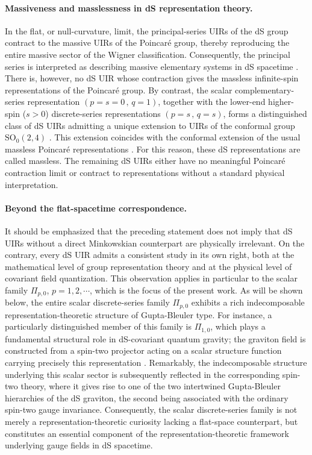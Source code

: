 \documentclass[aps,twocolumn,nofootinbib]{revtex4}
\begin{document}
\paragraph{Massiveness and masslessness in dS representation theory.} In the flat, or null-curvature, limit, the principal-series UIRs of the dS group contract to the massive UIRs of the Poincar\'{e} group, thereby reproducing the entire massive sector of the Wigner classification. Consequently, the principal series is interpreted as describing massive elementary systems in dS spacetime \cite{Gazeau2022, Mickelsson, Garidi}. There is, however, no dS UIR whose contraction gives the massless infinite-spin representations of the Poincar\'{e} group. By contrast, the scalar complementary-series representation $(p=s=0 \,,\, q=1)$, together with the lower-end higher-spin ($s>0$) discrete-series representations $(p=s \,,\, q=s)$, forms a distinguished class of dS UIRs admitting a unique extension to UIRs of the conformal group $\mathrm{SO}_0(2,4)$ \cite{GazPejTod2026, Barut}. This extension coincides with the conformal extension of the usual massless Poincar\'{e} representations \cite{Todorov, Mack}. For this reason, these dS representations are called massless. The remaining dS UIRs either have no meaningful Poincar\'{e} contraction limit or contract to representations without a standard physical interpretation.

\paragraph{Beyond the flat-spacetime correspondence.} It should be emphasized that the preceding statement does not imply that dS UIRs without a direct Minkowskian counterpart are physically irrelevant. On the contrary, every dS UIR admits a consistent study in its own right, both at the mathematical level of group representation theory and at the physical level of covariant field quantization. This observation applies in particular to the scalar family $\Pi_{p,0}$, $p=1,2,\cdots$, which is the focus of the present work. As will be shown below, the entire scalar discrete-series family $\Pi_{p,0}$ exhibits a rich indecomposable representation-theoretic structure of Gupta-Bleuler type. For instance, a particularly distinguished member of this family is $\Pi_{1,0}$, which plays a fundamental structural role in dS-covariant quantum gravity; the graviton field is constructed from a spin-two projector acting on a scalar structure function carrying precisely this representation \cite{Pejhan2019}. Remarkably, the indecomposable structure underlying this scalar sector is subsequently reflected in the corresponding spin-two theory, where it gives rise to one of the two intertwined Gupta-Bleuler hierarchies of the dS graviton, the second being associated with the ordinary spin-two gauge invariance. Consequently, the scalar discrete-series family is not merely a representation-theoretic curiosity lacking a flat-space counterpart, but constitutes an essential component of the representation-theoretic framework underlying gauge fields in dS spacetime.
\end{document}
